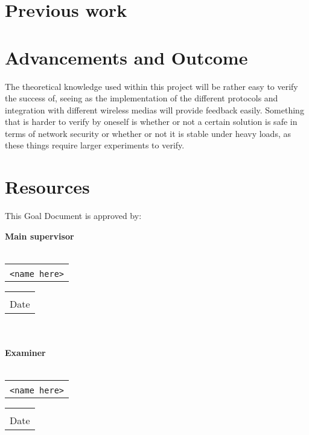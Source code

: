 \documentclass[a4paper]{article}
\makeatletter
\newcommand{\signature}[2]{%
	\noindent%
	\textbf{{#1}}\\\\
	\begin{tabular}{@{}p{2.5in}@{}}
		\\ \hline \\[-.75\normalbaselineskip]
		\texttt{{#2}}
	\end{tabular} \hspace{0in}
	\begin{tabular}{@{}p{2.5in}@{}}
		\\ \hline \\[-.75\normalbaselineskip]
		Date
	\end{tabular}\\
}
\makeatother
\begin{document}
\section{Previous work}


\section{Advancements and Outcome}
The theoretical knowledge used within this project will be rather easy
to verify the success of, seeing as the implementation of the different 
protocols and integration with different wireless medias will provide
feedback easily. Something that is harder to verify by oneself is whether
or not a certain solution is safe in terms of network security or whether
or not it is stable under heavy loads, as these things require larger
experiments to verify.

\section{Resources}


This Goal Document is approved by:

\signature{Main supervisor}{<name here>}\\

\signature{Examiner}{<name here>}
\end{document}
